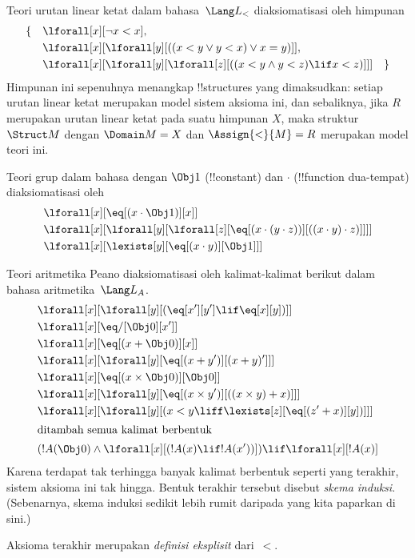 \documentclass[../../../include/open-logic-section]{subfiles}
\begin{document}


\begin{ex}
Teori urutan linear ketat dalam bahasa~$\Lang L_<$ diaksiomatisasi oleh
himpunan
\begin{align*}
\{\quad & \lforall[x][\lnot x < x], \\
& \lforall[x][\lforall[y][((x < y \lor y <
    x) \lor x = y)]], \\
& \lforall[x][\lforall[y][\lforall[z][((x < y
      \land y < z) \lif x < z)]]] \quad \}
\end{align*}
Himpunan ini sepenuhnya menangkap !!{structure}s yang dimaksudkan: setiap
urutan linear ketat merupakan model sistem aksioma ini, dan sebaliknya, jika
$R$ merupakan urutan linear ketat pada suatu himpunan $X$, maka struktur
$\Struct M$ dengan $\Domain M = X$ dan $\Assign{<}{M} = R$ merupakan model
teori ini.
\end{ex}

\begin{ex}
Teori grup dalam bahasa dengan $\Obj 1$ (!!{constant}) dan $\cdot$
(!!{function} dua-tempat) diaksiomatisasi oleh
\begin{align*}
& \lforall[x][\eq[(x \cdot \Obj 1)][x]]\\
& \lforall[x][\lforall[y][\lforall[z][\eq[(x \cdot (y \cdot z))][((x
          \cdot y) \cdot z)]]]]\\
& \lforall[x][\lexists[y][\eq[(x \cdot y)][\Obj 1]]]
\end{align*}
\end{ex}

\begin{ex}
Teori aritmetika Peano diaksiomatisasi oleh kalimat-kalimat berikut dalam
bahasa aritmetika~$\Lang L_A$.
\begin{align*}
& \lforall[x][\lforall[y][(\eq[x'][y'] \lif \eq[x][y])]]\\
& \lforall[x][\eq/[\Obj 0][x']]\\
& \lforall[x][\eq[(x + \Obj 0)][x]]\\
& \lforall[x][\lforall[y][\eq[(x + y')][(x + y)']]]\\
& \lforall[x][\eq[(x \times \Obj 0)][\Obj 0]]\\
& \lforall[x][\lforall[y][\eq[(x \times y')][((x \times y) + x)]]]\\
& \lforall[x][\lforall[y][(x < y \liff \lexists[z][\eq[(z' + x)][y])]]]\\
\intertext{ditambah semua kalimat berbentuk}
& (!A(\Obj 0) \land \lforall[x][(!A(x) \lif !A(x'))]) \lif \lforall[x][!A(x)]
\end{align*}
Karena terdapat tak terhingga banyak kalimat berbentuk seperti yang terakhir,
sistem aksioma ini tak hingga. Bentuk terakhir tersebut disebut
\emph{skema induksi}. (Sebenarnya, skema induksi sedikit lebih rumit daripada
yang kita paparkan di sini.)

Aksioma terakhir merupakan \emph{definisi eksplisit} dari~$<$.
\end{ex}
\end{document}
